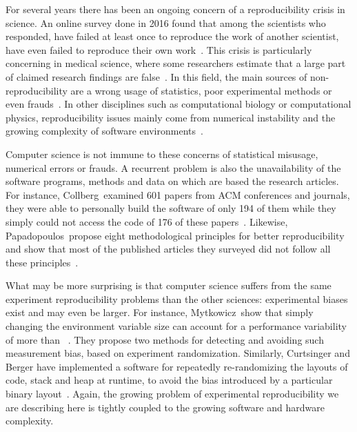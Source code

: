             For several years there has been an ongoing concern of a reproducibility crisis in science. An online survey
            done in 2016 found that among the  scientists who responded,  have failed at
            least once to reproduce the work of another scientist,  have even failed to reproduce
            their own work~\cite{nature_survey}. This crisis is particularly concerning in medical science, where some
            researchers estimate that a large part of claimed research findings are
            false~\cite{Ioannidis_2005,freedman}. In this field, the main sources of non-reproducibility are a wrong
            usage of statistics, poor experimental methods or even frauds~\cite{science_misconduct}. In other
            disciplines such as computational biology or computational physics, reproducibility issues mainly come
            from numerical instability and the growing complexity of software environments~\cite{dong2021}.

            Computer science is not immune to these concerns of statistical misusage, numerical errors or frauds.  A
            recurrent problem is also the unavailability of the software programs, methods and data on which are based the
            research articles. For instance, Collberg~\etal examined 601 papers from ACM conferences and journals, they
            were able to personally build the software of only 194 of them while they simply could not access the code
            of 176 of these papers~\cite{collberg2015repeatability}. Likewise, Papadopoulos~\etal propose eight
            methodological principles for better reproducibility and show that most of the published articles
            they surveyed did not follow all these principles~\cite{Papadopoulos_2019}.

            What may be more surprising is that computer science suffers from the same experiment reproducibility
            problems than the other sciences: experimental biases exist and may even be larger. For instance,
            Mytkowicz~\etal show that simply changing the environment variable size can account for a performance
            variability of more than ~\cite{Mytkowicz_2009}. They propose two methods for detecting
            and avoiding such measurement bias, based on experiment randomization. Similarly, Curtsinger and Berger have
            implemented a software for repeatedly re-randomizing the layouts of code, stack and heap at runtime, to
            avoid the bias introduced by a particular binary layout~\cite{stabilizer}. Again, the growing problem of
            experimental reproducibility we are describing here is tightly coupled to the growing software and hardware
            complexity.

